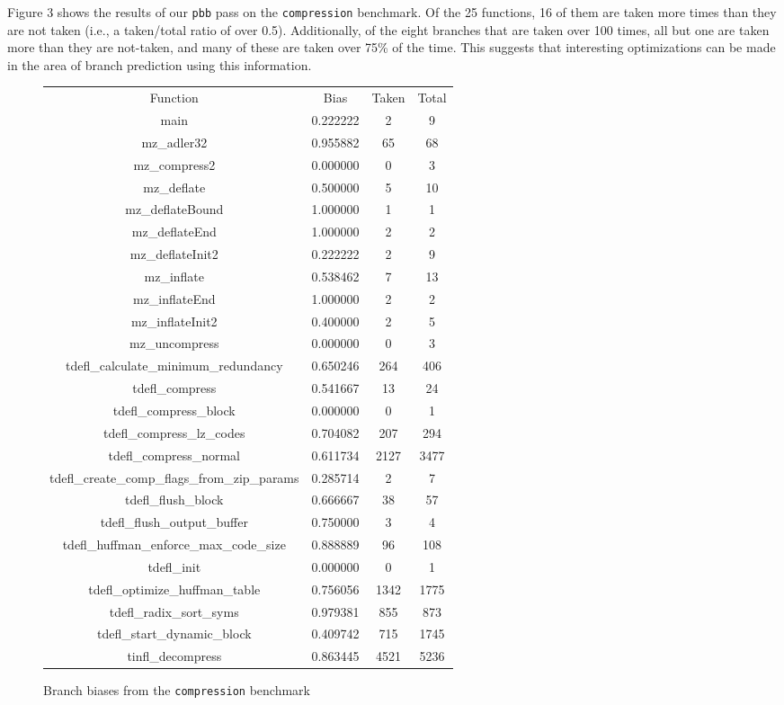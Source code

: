 \documentclass[12pt]{article}
\begin{document}
Figure 3 shows the results of our {\tt pbb} pass on the {\tt compression} benchmark. Of the 25 functions, 16 of them are taken more times than they are not taken (i.e., a taken/total ratio of over 0.5). Additionally, of the eight branches that are taken over 100 times, all but one are taken more than they are not-taken, and many of these are taken over 75\% of the time. This suggests that interesting optimizations can be made in the area of branch prediction using this information.

\begin{figure*}[!t]
\begin{center}
\begin{tabular} { |c|c|c|c| }
\hline
	Function & Bias & Taken & Total \\
	main & 0.222222 & 2  & 9 \\
	mz\_adler32 & 0.955882 &  65  & 68 \\
	mz\_compress2 & 0.000000  & 0 & 3 \\
	mz\_deflate & 0.500000  & 5 & 10 \\ 
	mz\_deflateBound & 1.000000 & 1 & 1\\
	mz\_deflateEnd & 1.000000 & 2  &  2 \\
	mz\_deflateInit2  & 0.222222 & 2  & 9 \\
	mz\_inflate & 0.538462 & 7 &13 \\
	mz\_inflateEnd & 1.000000 & 2 & 2 \\
	mz\_inflateInit2 & 0.400000 & 2 & 5 \\
	mz\_uncompress & 0.000000 & 0 & 3 \\
	tdefl\_calculate\_minimum\_redundancy & 0.650246 & 264 & 406 \\
	tdefl\_compress  & 0.541667 & 13  & 24 \\
	tdefl\_compress\_block & 0.000000 & 0  & 1 \\
	tdefl\_compress\_lz\_codes & 0.704082 & 207& 294 \\
	tdefl\_compress\_normal & 0.611734 & 2127 & 3477 \\
	tdefl\_create\_comp\_flags\_from\_zip\_params & 0.285714 & 2 & 7 \\
	tdefl\_flush\_block & 0.666667 & 38 & 57 \\
	tdefl\_flush\_output\_buffer & 0.750000 & 3 & 4 \\
	tdefl\_huffman\_enforce\_max\_code\_size & 0.888889 & 96 &108 \\
	tdefl\_init & 0.000000 & 0 & 1 \\
	tdefl\_optimize\_huffman\_table & 0.756056 & 1342 & 1775 \\
	tdefl\_radix\_sort\_syms  & 0.979381 & 855  & 873 \\
	tdefl\_start\_dynamic\_block &  0.409742 & 715 &  1745 \\
	tinfl\_decompress  & 0.863445 & 4521 & 5236 \\
\hline
\end{tabular}
\caption{Branch biases from the {\tt compression} benchmark}
\label{BRANCH}
\end{center}
\end{figure*}
\end{document}
